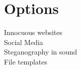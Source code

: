 \section{Options}
\begin{description}
	\item[Innocuous websites] 
	\item[Social Media]
	\item[Steganography in sound]
	\item[File templates]
\end{description}